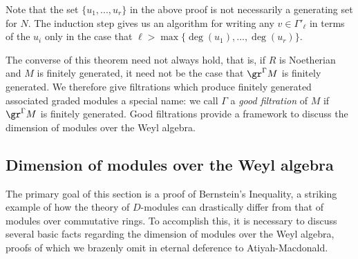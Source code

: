 Note that the set $\{u_1,...,u_r\}$ in the above proof is not necessarily a generating set for $N$. The induction step gives us an algorithm for writing any $v \in \Gamma'_\ell$ in terms of the $u_i$ only in the case that $\ell > \max\{\deg(u_1),...,\deg(u_r)\}$.

The converse of this theorem need not always hold, that is, if $R$ is Noetherian and $M$ is finitely generated, it need not be the case that $\gr^{\Gamma}M$ is finitely generated. We therefore give filtrations which produce finitely generated associated graded modules a special name: we call $\Gamma$ a \emph{good filtration} of $M$ if $\gr^\Gamma M$ is finitely generated. Good filtrations provide a framework to discuss the dimension of modules over the Weyl algebra.

\subsection{Dimension of modules over the Weyl algebra}
The primary goal of this section is a proof of Bernstein's Inequality, a striking example of how the theory of $D$-modules can drastically differ from that of modules over commutative rings. To accomplish this, it is necessary to discuss several basic facts regarding the dimension of modules over the Weyl algebra, proofs of which we brazenly omit in eternal deference to Atiyah-Macdonald.
